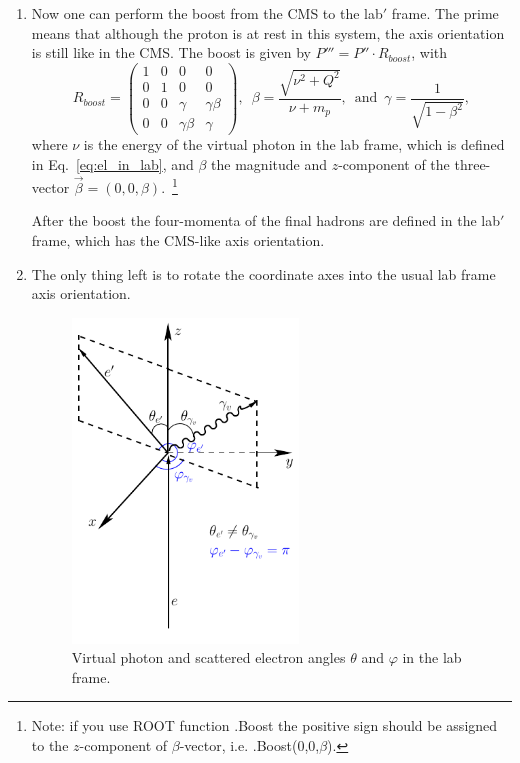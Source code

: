 \begin{enumerate}
\item Now one can perform the boost from the CMS to the lab$'$ frame. The prime means that although the proton is at rest in this system, the axis orientation is still like in the CMS. The boost is given by $P''' = P''\cdot R_{boost}$, with 
\begin{equation}
R_{boost} = \begin{pmatrix}
1 &0  &0  &0 \\ 
0 &1  &0  &0 \\ 
 0&  0& \gamma  &\gamma \beta  \\ 
 0&  0& \gamma \beta  & \gamma 
\end{pmatrix}, \, \, \, \beta =\frac{\sqrt{\nu^2+Q^{2}}}{\nu+m_{p}}, \, \, \,  \textrm{and} \,\,\,   \gamma =\frac{1}{\sqrt{1-\beta ^{2}}},
\end{equation}
where $\nu$ is the energy of the virtual photon in the lab frame, which is defined in Eq.~\eqref{eq:el_in_lab}, and $\beta$ the magnitude and $z$-component of the three-vector $\overrightarrow{\beta}=(0,0,\beta)$.~\footnote[4]{
Note: if you use ROOT function .Boost the positive sign should be assigned to the $z$-component of $\beta$-vector, i.e. .Boost(0,0,$\beta$).}

After the boost the four-momenta of the final hadrons are defined in the lab$'$ frame, which has the CMS-like axis orientation.

\item The only thing left is to rotate the coordinate axes into the usual lab frame axis orientation.

\begin{figure}[htp]
\begin{center}
\includegraphics[width=6cm]{pictures/lab_mom_calc/electron_angles.pdf}
\caption{\small Virtual photon and scattered electron angles $\theta$ and $\varphi$ in the lab frame.} \label{fig:el_angles}
\end{center}
\end{figure}


\end{enumerate}
